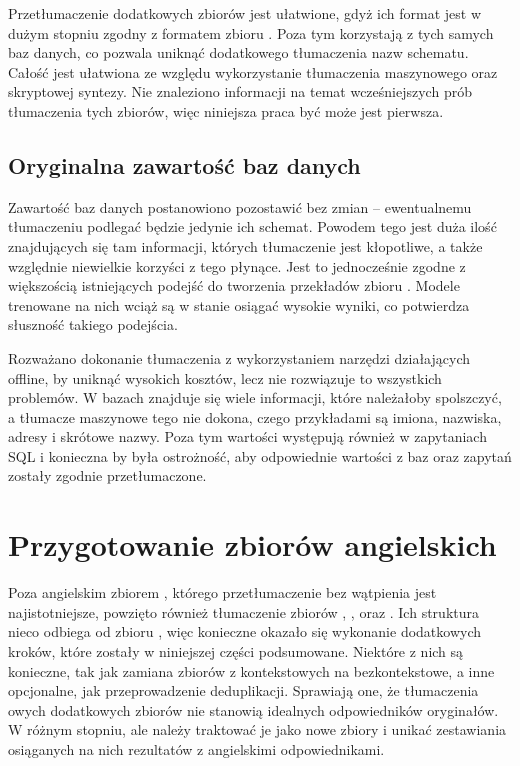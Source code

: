 Przetłumaczenie dodatkowych zbiorów jest ułatwione, gdyż ich format jest w dużym stopniu zgodny z formatem zbioru . Poza tym korzystają z tych samych baz danych, co pozwala uniknąć dodatkowego tłumaczenia nazw schematu. Całość jest ułatwiona ze względu wykorzystanie tłumaczenia maszynowego oraz skryptowej syntezy. Nie znaleziono informacji na temat wcześniejszych prób tłumaczenia tych zbiorów, więc niniejsza praca być może jest pierwsza.

\subsection{Oryginalna zawartość baz danych}
Zawartość baz danych postanowiono pozostawić bez zmian -- ewentualnemu tłumaczeniu podlegać będzie jedynie ich schemat. Powodem tego jest duża ilość znajdujących się tam informacji, których tłumaczenie jest kłopotliwe, a także względnie niewielkie korzyści z tego płynące. Jest to jednocześnie zgodne z większością istniejących podejść do tworzenia przekładów zbioru . Modele trenowane na nich wciąż są w stanie osiągać wysokie wyniki, co potwierdza słuszność takiego podejścia.

Rozważano dokonanie tłumaczenia z wykorzystaniem narzędzi działających offline, by uniknąć wysokich kosztów, lecz nie rozwiązuje to wszystkich problemów. W bazach znajduje się wiele informacji, które należałoby spolszczyć, a tłumacze maszynowe tego nie dokona, czego przykładami są imiona, nazwiska, adresy i skrótowe nazwy. Poza tym wartości występują również w zapytaniach SQL i konieczna by była ostrożność, aby odpowiednie wartości z baz oraz zapytań zostały zgodnie przetłumaczone.

\section{Przygotowanie zbiorów angielskich}
Poza angielskim zbiorem , którego przetłumaczenie bez wątpienia jest najistotniejsze, powzięto również tłumaczenie zbiorów , ,  oraz . Ich struktura nieco odbiega od zbioru , więc konieczne okazało się wykonanie dodatkowych kroków, które zostały w niniejszej części podsumowane. Niektóre z nich są konieczne, tak jak zamiana zbiorów z kontekstowych na bezkontekstowe, a inne opcjonalne, jak przeprowadzenie deduplikacji. Sprawiają one, że tłumaczenia owych dodatkowych zbiorów nie stanowią idealnych odpowiedników oryginałów. W różnym stopniu, ale należy traktować je jako nowe zbiory i unikać zestawiania osiąganych na nich rezultatów z angielskimi odpowiednikami.

